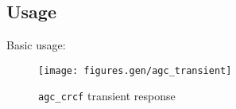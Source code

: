 \subsection{Usage}
Basic usage:


\begin{figure}
\centering
  \texttt{[image: figures.gen/agc\_transient]}
\caption{{\tt agc\_crcf} transient response}
\label{fig:module:agc:transient}
\end{figure}


